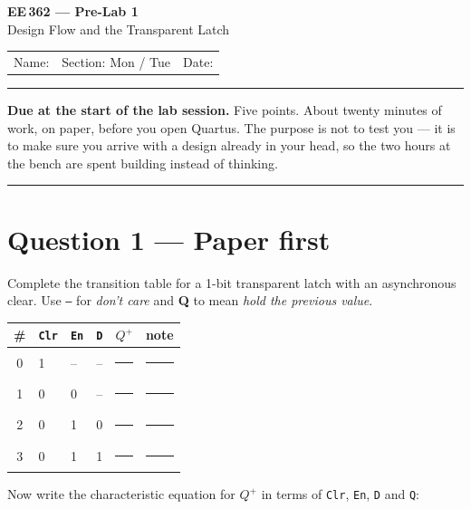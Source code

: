 \documentclass[11pt]{article}
\newcommand{\code}[1]{\texttt{#1}}
\newcommand{\answerbox}[1]{\vspace{2pt}\fbox{\parbox[c][#1][c]{\dimexpr\linewidth-2\fboxsep-2\fboxrule}{\ }}\vspace{4pt}}
\begin{document}
\begin{center}
{\Large\bfseries EE\,362 --- Pre-Lab 1}\\[2pt]
{\large Design Flow and the Transparent Latch}\\[6pt]
\begin{tabular}{@{}p{6.5cm}p{4cm}p{4cm}@{}}
Name: \hrulefill & Section: Mon / Tue & Date: \hrulefill
\end{tabular}
\end{center}

\vspace{2pt}\hrule\vspace{4pt}

{\small\textbf{Due at the start of the lab session.} Five points. About twenty
minutes of work, on paper, before you open Quartus. The purpose is not to test
you --- it is to make sure you arrive with a design already in your head, so the
two hours at the bench are spent building instead of thinking.}

\vspace{4pt}\hrule

\section*{Question 1 --- Paper first}

Complete the transition table for a 1-bit transparent latch with an asynchronous
clear. Use \code{--} for \emph{don't care} and \textbf{Q} to mean \emph{hold the
previous value}.

\begin{center}
\begin{tabular}{clll@{\hskip 8pt}||@{\hskip 8pt}l@{\hskip 20pt}l}
\toprule
\# & \code{Clr} & \code{En} & \code{D} & $Q^{+}$ & note \\
\midrule
0 & 1 & -- & -- & \rule{2.2cm}{0.4pt} & \rule{4.5cm}{0.4pt} \\[4pt]
1 & 0 & 0 & -- & \rule{2.2cm}{0.4pt} & \rule{4.5cm}{0.4pt} \\[4pt]
2 & 0 & 1 & 0 & \rule{2.2cm}{0.4pt} & \rule{4.5cm}{0.4pt} \\[4pt]
3 & 0 & 1 & 1 & \rule{2.2cm}{0.4pt} & \rule{4.5cm}{0.4pt} \\
\bottomrule
\end{tabular}
\end{center}

Now write the characteristic equation for $Q^{+}$ in terms of
\code{Clr}, \code{En}, \code{D} and \code{Q}:

\answerbox{2.0cm}
\end{document}
